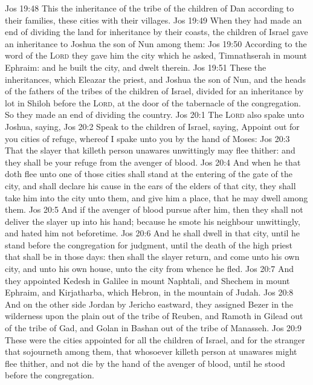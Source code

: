 \vs Jos 19:48 This  the inheritance of the tribe of the children of Dan according to their families, these cities with their villages.
\vs Jos 19:49 When they had made an end of dividing the land for inheritance by their coasts, the children of Israel gave an inheritance to Joshua the son of Nun among them:
\vs Jos 19:50 According to the word of the \textsc{Lord} they gave him the city which he asked,  Timnathserah in mount Ephraim: and he built the city, and dwelt therein.
\vs Jos 19:51 These  the inheritances, which Eleazar the priest, and Joshua the son of Nun, and the heads of the fathers of the tribes of the children of Israel, divided for an inheritance by lot in Shiloh before the \textsc{Lord}, at the door of the tabernacle of the congregation. So they made an end of dividing the country.
\vs Jos 20:1 The \textsc{Lord} also spake unto Joshua, saying,
\vs Jos 20:2 Speak to the children of Israel, saying, Appoint out for you cities of refuge, whereof I spake unto you by the hand of Moses:
\vs Jos 20:3 That the slayer that killeth  person unawares  unwittingly may flee thither: and they shall be your refuge from the avenger of blood.
\vs Jos 20:4 And when he that doth flee unto one of those cities shall stand at the entering of the gate of the city, and shall declare his cause in the ears of the elders of that city, they shall take him into the city unto them, and give him a place, that he may dwell among them.
\vs Jos 20:5 And if the avenger of blood pursue after him, then they shall not deliver the slayer up into his hand; because he smote his neighbour unwittingly, and hated him not beforetime.
\vs Jos 20:6 And he shall dwell in that city, until he stand before the congregation for judgment,  until the death of the high priest that shall be in those days: then shall the slayer return, and come unto his own city, and unto his own house, unto the city from whence he fled.
\vs Jos 20:7 And they appointed Kedesh in Galilee in mount Naphtali, and Shechem in mount Ephraim, and Kirjatharba, which  Hebron, in the mountain of Judah.
\vs Jos 20:8 And on the other side Jordan by Jericho eastward, they assigned Bezer in the wilderness upon the plain out of the tribe of Reuben, and Ramoth in Gilead out of the tribe of Gad, and Golan in Bashan out of the tribe of Manasseh.
\vs Jos 20:9 These were the cities appointed for all the children of Israel, and for the stranger that sojourneth among them, that whosoever killeth  person at unawares might flee thither, and not die by the hand of the avenger of blood, until he stood before the congregation.
